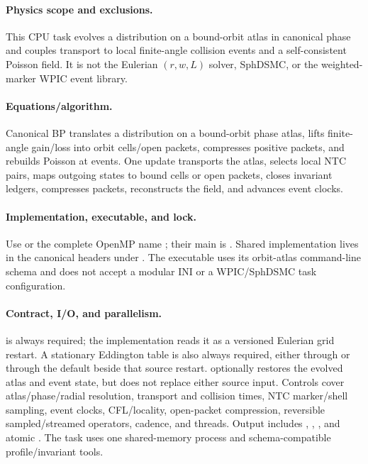 \paragraph{Physics scope and exclusions.}
This CPU task evolves a distribution on a bound-orbit atlas in canonical phase
and couples transport to local finite-angle collision events and a
self-consistent Poisson field.  It is not the Eulerian \((r,w,L)\) solver,
SphDSMC, or the weighted-marker WPIC event library.
\paragraph{Equations/algorithm.}
Canonical BP translates a distribution on a bound-orbit phase atlas, lifts
finite-angle gain/loss into orbit cells/open packets, compresses positive
packets, and rebuilds Poisson at events.  One update transports the atlas,
selects local NTC pairs, maps outgoing states to bound cells or open packets,
closes invariant ledgers, compresses packets, reconstructs the field, and
advances event clocks.
\paragraph{Implementation, executable, and lock.}
Use  or the complete OpenMP
name ; their main is
.  Shared
implementation lives in the canonical headers under .
The executable uses
its orbit-atlas command-line schema and does not accept a modular INI or a
WPIC/SphDSMC task configuration.
\paragraph{Contract, I/O, and parallelism.}
 is always required; the implementation reads it as a
versioned Eulerian grid restart.  A stationary Eddington table is also always
required, either through  or through the default
 beside that source restart.
 optionally restores the evolved atlas and
event state, but does not replace either source input.  Controls cover
atlas/phase/radial resolution, transport and collision times, NTC
marker/shell sampling, event clocks, CFL/locality, open-packet compression,
reversible sampled/streamed operators, cadence, and threads.
Output includes , ,
, and atomic .  The task
uses one shared-memory process and schema-compatible profile/invariant tools.
